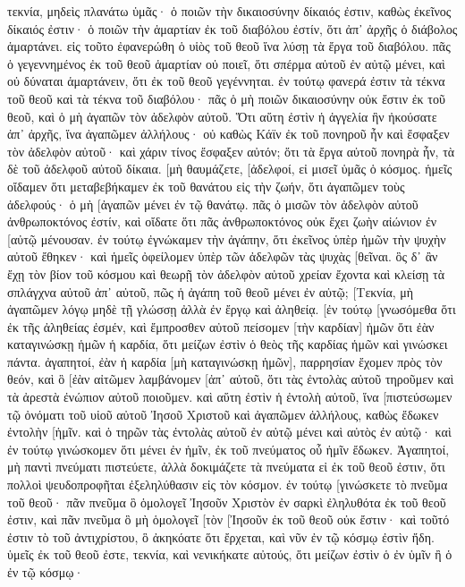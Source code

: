 τεκνία, μηδεὶς πλανάτω ὑμᾶς· ὁ ποιῶν τὴν δικαιοσύνην δίκαιός ἐστιν, καθὼς ἐκεῖνος δίκαιός ἐστιν· 
ὁ ποιῶν τὴν ἁμαρτίαν ἐκ τοῦ διαβόλου ἐστίν, ὅτι ἀπ᾽ ἀρχῆς ὁ διάβολος ἁμαρτάνει. εἰς τοῦτο ἐφανερώθη ὁ υἱὸς τοῦ θεοῦ ἵνα λύσῃ τὰ ἔργα τοῦ διαβόλου. 
πᾶς ὁ γεγεννημένος ἐκ τοῦ θεοῦ ἁμαρτίαν οὐ ποιεῖ, ὅτι σπέρμα αὐτοῦ ἐν αὐτῷ μένει, καὶ οὐ δύναται ἁμαρτάνειν, ὅτι ἐκ τοῦ θεοῦ γεγέννηται. 
ἐν τούτῳ φανερά ἐστιν τὰ τέκνα τοῦ θεοῦ καὶ τὰ τέκνα τοῦ διαβόλου· πᾶς ὁ μὴ ποιῶν δικαιοσύνην οὐκ ἔστιν ἐκ τοῦ θεοῦ, καὶ ὁ μὴ ἀγαπῶν τὸν ἀδελφὸν αὐτοῦ. 
Ὅτι αὕτη ἐστὶν ἡ ἀγγελία ἣν ἠκούσατε ἀπ᾽ ἀρχῆς, ἵνα ἀγαπῶμεν ἀλλήλους· 
οὐ καθὼς Κάϊν ἐκ τοῦ πονηροῦ ἦν καὶ ἔσφαξεν τὸν ἀδελφὸν αὐτοῦ· καὶ χάριν τίνος ἔσφαξεν αὐτόν; ὅτι τὰ ἔργα αὐτοῦ πονηρὰ ἦν, τὰ δὲ τοῦ ἀδελφοῦ αὐτοῦ δίκαια. 
[μὴ θαυμάζετε, [ἀδελφοί, εἰ μισεῖ ὑμᾶς ὁ κόσμος. 
ἡμεῖς οἴδαμεν ὅτι μεταβεβήκαμεν ἐκ τοῦ θανάτου εἰς τὴν ζωήν, ὅτι ἀγαπῶμεν τοὺς ἀδελφούς· ὁ μὴ [ἀγαπῶν μένει ἐν τῷ θανάτῳ. 
πᾶς ὁ μισῶν τὸν ἀδελφὸν αὐτοῦ ἀνθρωποκτόνος ἐστίν, καὶ οἴδατε ὅτι πᾶς ἀνθρωποκτόνος οὐκ ἔχει ζωὴν αἰώνιον ἐν [αὐτῷ μένουσαν. 
ἐν τούτῳ ἐγνώκαμεν τὴν ἀγάπην, ὅτι ἐκεῖνος ὑπὲρ ἡμῶν τὴν ψυχὴν αὐτοῦ ἔθηκεν· καὶ ἡμεῖς ὀφείλομεν ὑπὲρ τῶν ἀδελφῶν τὰς ψυχὰς [θεῖναι. 
ὃς δ᾽ ἂν ἔχῃ τὸν βίον τοῦ κόσμου καὶ θεωρῇ τὸν ἀδελφὸν αὐτοῦ χρείαν ἔχοντα καὶ κλείσῃ τὰ σπλάγχνα αὐτοῦ ἀπ᾽ αὐτοῦ, πῶς ἡ ἀγάπη τοῦ θεοῦ μένει ἐν αὐτῷ; 
[Τεκνία, μὴ ἀγαπῶμεν λόγῳ μηδὲ τῇ γλώσσῃ ἀλλὰ ἐν ἔργῳ καὶ ἀληθείᾳ. 
[ἐν τούτῳ [γνωσόμεθα ὅτι ἐκ τῆς ἀληθείας ἐσμέν, καὶ ἔμπροσθεν αὐτοῦ πείσομεν [τὴν καρδίαν] ἡμῶν 
ὅτι ἐὰν καταγινώσκῃ ἡμῶν ἡ καρδία, ὅτι μείζων ἐστὶν ὁ θεὸς τῆς καρδίας ἡμῶν καὶ γινώσκει πάντα. 
ἀγαπητοί, ἐὰν ἡ καρδία [μὴ καταγινώσκῃ ἡμῶν], παρρησίαν ἔχομεν πρὸς τὸν θεόν, 
καὶ ὃ [ἐὰν αἰτῶμεν λαμβάνομεν [ἀπ᾽ αὐτοῦ, ὅτι τὰς ἐντολὰς αὐτοῦ τηροῦμεν καὶ τὰ ἀρεστὰ ἐνώπιον αὐτοῦ ποιοῦμεν. 
καὶ αὕτη ἐστὶν ἡ ἐντολὴ αὐτοῦ, ἵνα [πιστεύσωμεν τῷ ὀνόματι τοῦ υἱοῦ αὐτοῦ Ἰησοῦ Χριστοῦ καὶ ἀγαπῶμεν ἀλλήλους, καθὼς ἔδωκεν ἐντολὴν [ἡμῖν. 
καὶ ὁ τηρῶν τὰς ἐντολὰς αὐτοῦ ἐν αὐτῷ μένει καὶ αὐτὸς ἐν αὐτῷ· καὶ ἐν τούτῳ γινώσκομεν ὅτι μένει ἐν ἡμῖν, ἐκ τοῦ πνεύματος οὗ ἡμῖν ἔδωκεν. 
Ἀγαπητοί, μὴ παντὶ πνεύματι πιστεύετε, ἀλλὰ δοκιμάζετε τὰ πνεύματα εἰ ἐκ τοῦ θεοῦ ἐστιν, ὅτι πολλοὶ ψευδοπροφῆται ἐξεληλύθασιν εἰς τὸν κόσμον. 
ἐν τούτῳ [γινώσκετε τὸ πνεῦμα τοῦ θεοῦ· πᾶν πνεῦμα ὃ ὁμολογεῖ Ἰησοῦν Χριστὸν ἐν σαρκὶ ἐληλυθότα ἐκ τοῦ θεοῦ ἐστιν, 
καὶ πᾶν πνεῦμα ὃ μὴ ὁμολογεῖ [τὸν [Ἰησοῦν ἐκ τοῦ θεοῦ οὐκ ἔστιν· καὶ τοῦτό ἐστιν τὸ τοῦ ἀντιχρίστου, ὃ ἀκηκόατε ὅτι ἔρχεται, καὶ νῦν ἐν τῷ κόσμῳ ἐστὶν ἤδη. 
ὑμεῖς ἐκ τοῦ θεοῦ ἐστε, τεκνία, καὶ νενικήκατε αὐτούς, ὅτι μείζων ἐστὶν ὁ ἐν ὑμῖν ἢ ὁ ἐν τῷ κόσμῳ· 
